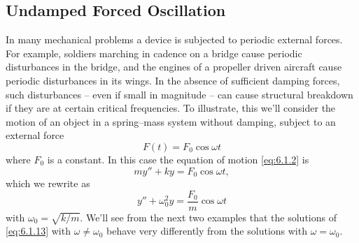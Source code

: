 \documentclass{ximera}
\begin{document}
\subsection*{Undamped Forced Oscillation}

In many mechanical problems a device is subjected to periodic external
forces. For example, soldiers marching in cadence on a bridge cause
periodic disturbances in the bridge, and the engines of a propeller
driven aircraft cause periodic disturbances in its wings. In the
absence of sufficient damping forces, such disturbances -- even if
small in magnitude -- can cause structural breakdown if they are at
certain critical frequencies. To illustrate, this we'll consider the
motion of an object in a spring--mass system without damping, subject
to an external force
$$
F(t)=F_0\cos\omega t
$$
where $F_0$ is a constant. In this case the equation of motion
\eqref{eq:6.1.2} is
$$
my''+ky=F_0\cos\omega t,
$$
which we rewrite  as
\begin{equation}\label{eq:6.1.13}
y''+\omega_0^2y=\frac{F_0}{m}\cos\omega t
\end{equation}
with $\omega_0=\sqrt{k/m}$.
We'll see from the next two examples that the solutions of
\eqref{eq:6.1.13}
with $\omega\ne\omega_0$ behave very differently from the solutions with
$\omega=\omega_0$.
\end{document}
